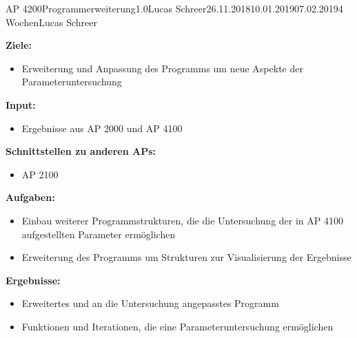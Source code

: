 \begin{appendix}
\clearpage
\begin{wpd}{AP 4200}{Programmerweiterung}{1.0}{Lucas Schreer}{26.11.2018}{10.01.2019}{07.02.2019}{4 Wochen}{Lucas Schreer}
    {
    \textbf{Ziele:}
    \begin{itemize}
        \item Erweiterung und Anpassung des Programms um neue Aspekte der Parameteruntersuchung
    \end{itemize}
    \textbf{Input:}
    \begin{itemize}
        \item Ergebnisse aus AP 2000 und AP 4100
    \end{itemize}
    \textbf{Schnittstellen zu anderen APs:}
    \begin{itemize}
        \item AP 2100
    \end{itemize}
    \textbf{Aufgaben:}
    \begin{itemize}
        \item Einbau weiterer Programmstrukturen, die die Untersuchung der in AP 4100 aufgestellten Parameter ermöglichen
        \item Erweiterung des Programms um Strukturen zur Visualisierung der Ergebnisse
    \end{itemize}
    \textbf{Ergebnisse:}
    \begin{itemize}
        \item Erweitertes und an die Untersuchung angepasstes Programm 
        \item Funktionen und Iterationen, die eine Parameteruntersuchung ermöglichen  
    \end{itemize}
    }
\end{wpd}



\end{appendix}

